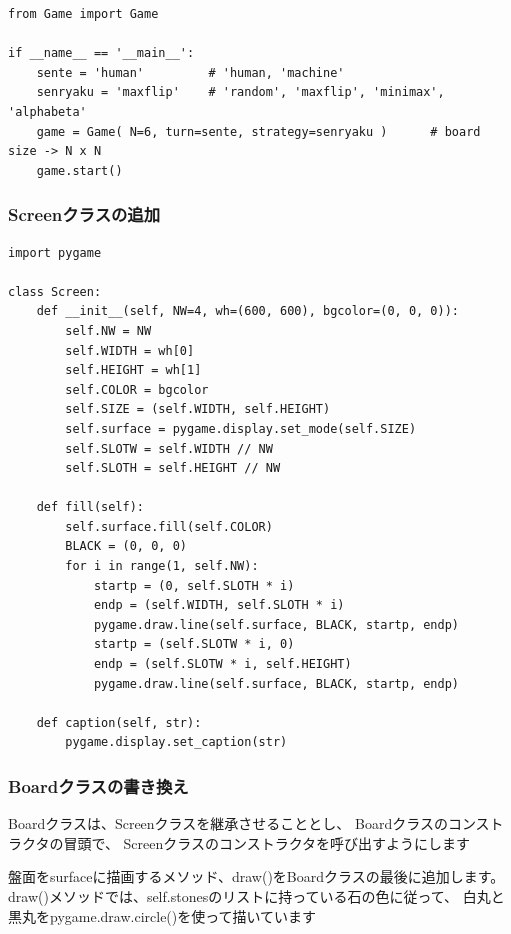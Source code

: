 \documentclass[uplatex,a4paper,11pt,oneside,openany]{jsbook}
\begin{document}
\begin{lstlisting}[caption=main,label=othello00]
from Game import Game

if __name__ == '__main__':
    sente = 'human'         # 'human, 'machine'
    senryaku = 'maxflip'    # 'random', 'maxflip', 'minimax', 'alphabeta'
    game = Game( N=6, turn=sente, strategy=senryaku )      # board size -> N x N
    game.start()
\end{lstlisting}

\subsubsection{Screenクラスの追加}

\begin{lstlisting}[caption=Screen class,label=othello07]
import pygame

class Screen:
    def __init__(self, NW=4, wh=(600, 600), bgcolor=(0, 0, 0)):
        self.NW = NW
        self.WIDTH = wh[0]
        self.HEIGHT = wh[1]
        self.COLOR = bgcolor
        self.SIZE = (self.WIDTH, self.HEIGHT)
        self.surface = pygame.display.set_mode(self.SIZE)
        self.SLOTW = self.WIDTH // NW
        self.SLOTH = self.HEIGHT // NW

    def fill(self):
        self.surface.fill(self.COLOR)
        BLACK = (0, 0, 0)
        for i in range(1, self.NW):
            startp = (0, self.SLOTH * i)
            endp = (self.WIDTH, self.SLOTH * i)
            pygame.draw.line(self.surface, BLACK, startp, endp)
            startp = (self.SLOTW * i, 0)
            endp = (self.SLOTW * i, self.HEIGHT)
            pygame.draw.line(self.surface, BLACK, startp, endp)

    def caption(self, str):
        pygame.display.set_caption(str)
\end{lstlisting}

\subsubsection{Boardクラスの書き換え}

Boardクラスは、Screenクラスを継承させることとし、
Boardクラスのコンストラクタの冒頭で、
Screenクラスのコンストラクタを呼び出すようにします

盤面をsurfaceに描画するメソッド、draw()をBoardクラスの最後に追加します。
draw()メソッドでは、self.stonesのリストに持っている石の色に従って、
白丸と黒丸をpygame.draw.circle()を使って描いています
\end{document}

